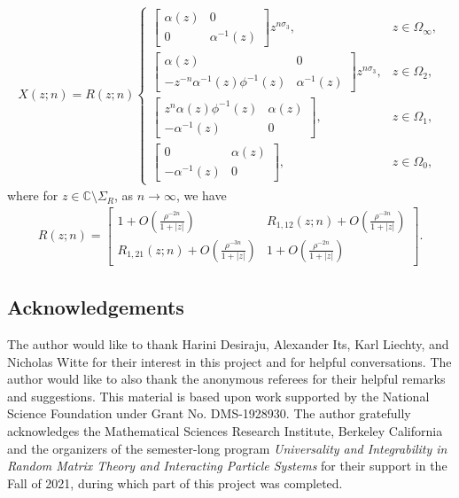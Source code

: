 \documentclass[10pt,a4paper]{amsart}
\numberwithin{equation}{section}
\newcommand{\C}{{\mathbb C}}
\newcommand{\al}{\alpha}
\newcommand{\Om}{\Omega}
\newcommand{\di}{\displaystyle}
\begin{document}
		\begin{gather}\label{X in terms of R exact}
			X(z;n) = R(z;n)\begin{cases} \begin{bmatrix} \al(z) & 0 \\ 0 & \al^{-1}(z) \end{bmatrix}z^{n\sigma_3}, & z \in \Om_{\infty}, \\[14pt]
				\begin{bmatrix} \al(z) & 0 \\ -z^{-n}\al^{-1}(z) \phi^{-1}(z) & \al^{-1}(z) \end{bmatrix}z^{n\sigma_3}, & z \in \Om_{2}, \\[14pt]
				\begin{bmatrix} z^{n}\al(z) \phi^{-1}(z) & \al(z) \\ -\al^{-1}(z) & 0 \end{bmatrix}, & z \in \Om_{1}, \\[14pt] \begin{bmatrix} 0 & \al(z) \\ -\al^{-1}(z) & 0 \end{bmatrix}, & z \in \Om_{0},
			\end{cases}
		\end{gather}
		where for $z \in \C \setminus \Sigma_{R}$, as $n \to\infty$, we have
		\begin{gather}\label{R asymp}
			R(z;n)=\di \begin{bmatrix}
				1 + O \left(\frac{ \rho^{-2n}}{ 1+|z| }\right) & R_{1,12}(z;n)+ O \left(\frac{ \rho^{-3n}}{ 1+|z| }\right) \\
				R_{1,21}(z;n)+ O \left(\frac{ \rho^{-3n}}{ 1+|z| }\right) & 1 +O \left(\frac{ \rho^{-2n}}{ 1+|z| }\right)
			\end{bmatrix}.
		\end{gather}


		\subsection*{Acknowledgements}
		The author would like to thank Harini Desiraju, Alexander Its, Karl Liechty, and Nicholas Witte for their interest in this project and for helpful conversations. The author would like to also thank the anonymous referees for their helpful remarks and suggestions. This material is based upon work supported by the National Science Foundation under Grant No. DMS-1928930. The author gratefully acknowledges the Mathematical Sciences Research Institute, Berkeley California and the organizers of the semester-long program \textit{Universality and Integrability in Random Matrix Theory and Interacting Particle Systems} for their support in the Fall of 2021, during which part of this project
		was completed.
\end{document}
